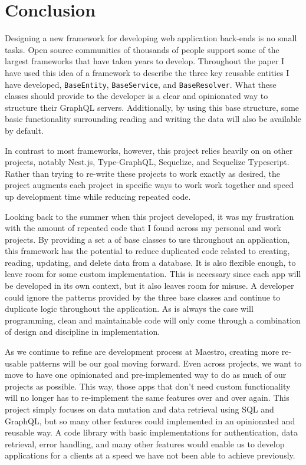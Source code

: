 \section{Conclusion}

Designing a new framework for developing web application back-ends is no small tasks.  Open source communities of thousands of people support some of the largest frameworks that have taken years to develop. Throughout the paper I have used this idea of a framework to describe the three key reusable entities I have developed, \verb!BaseEntity!, \verb!BaseService!, and \verb!BaseResolver!.  What these classes should provide to the developer is a clear and opinionated way to structure their GraphQL servers.  Additionally, by using this base structure, some basic functionality surrounding reading and writing the data will also be available by default.

In contrast to most frameworks, however, this project relies heavily on on other projects, notably Nest.js, Type-GraphQL, Sequelize, and Sequelize Typescript.  Rather than trying to re-write these projects to work exactly as desired, the project augments each project in specific ways to work work together and speed up development time while reducing repeated code.

Looking back to the summer when this project developed, it was my frustration with the amount of repeated code that I found across my personal and work projects.  By providing a set a of base classes to use throughout an application, this framework has the potential to reduce duplicated code related to creating, reading, updating, and delete data from a database.  It is also flexible enough, to leave room for some custom implementation.  This is necessary since each app will be developed in its own context, but it also leaves room for misuse.  A developer could ignore the patterns provided by the three base classes and continue to duplicate logic throughout the application.  As is always the case will programming, clean and maintainable code will only come through a combination of design and discipline in implementation.

As we continue to refine are development process at Maestro, creating more re-usable patterns will be our goal moving forward.  Even across projects, we want to move to have one opinionated and pre-implemented way to do as much of our projects as possible.  This way, those apps that don't need custom functionality will no longer has to re-implement the same features over and over again.  This project simply focuses on data mutation and data retrieval using SQL and GraphQL, but so many other features could implemented in an opinionated and reusable way.  A code library with basic implementations for authentication, data retrieval, error handling, and many other features would enable us to develop applications for a clients at a speed we have not been able to achieve previously.